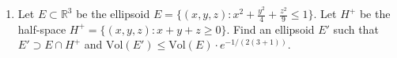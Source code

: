 \documentclass[11pt]{article}
\newcommand{\setR}{\mathbb{R}}
\newcommand{\vol}{\mathrm{Vol}}
\begin{document}
\begin{enumerate}[1)]
\item Let $E ⊂\setR^3$ be the ellipsoid
  $E= \{(x,y,z) :x^2 + \frac{y^2}{4} + \frac{z^2} {9} ≤1\}$.  Let
  $H^+$ be the half-space $H^+ = \{(x,y,z) : x+ y+ z ≥0\}$.  Find an
  ellipsoid $E'$ such that $E'⊃E∩H^+$ and
  $\vol(E') ≤\vol(E) ⋅e^{−1/(2(3+1))}$.





\end{enumerate}




  
\end{document}

